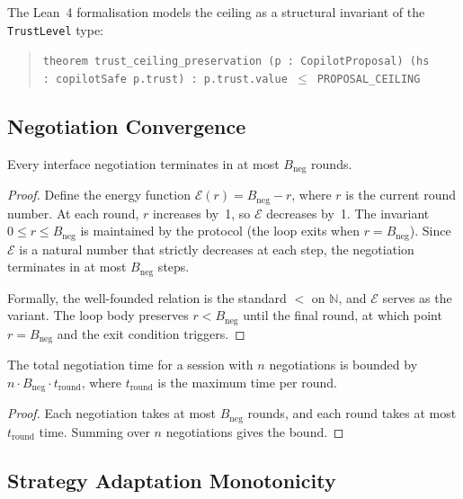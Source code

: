 \documentclass[11pt]{article}
\newcommand{\negbound}{B_{\mathrm{neg}}}
\newcommand{\energy}{\mathcal{E}}
\begin{document}
The Lean~4 formalisation models the ceiling as a structural
invariant of the \texttt{TrustLevel} type:
\begin{quote}
\texttt{theorem trust\_ceiling\_preservation (p :\ CopilotProposal)
        (hs :\ copilotSafe p.trust) :\
        p.trust.value $\leq$ PROPOSAL\_CEILING}
\end{quote}

\subsection{Negotiation Convergence}\label{sec:formal-neg}

\begin{theorem}\label{thm:neg-conv}
Every interface negotiation terminates in at most $\negbound$ rounds.
\end{theorem}

\begin{proof}
Define the energy function $\energy(r) = \negbound - r$, where $r$
is the current round number.  At each round, $r$ increases by~1,
so $\energy$ decreases by~1.  The invariant $0 \leq r \leq
\negbound$ is maintained by the protocol (the loop exits when
$r = \negbound$).  Since $\energy$ is a natural number that
strictly decreases at each step, the negotiation terminates in at
most $\negbound$ steps.

Formally, the well-founded relation is the standard $<$ on
$\mathbb{N}$, and $\energy$ serves as the variant.  The loop body
preserves $r < \negbound$ until the final round, at which point
$r = \negbound$ and the exit condition triggers.
\end{proof}

\begin{corollary}\label{cor:neg-termination}
The total negotiation time for a session with $n$ negotiations is
bounded by $n \cdot \negbound \cdot t_{\mathrm{round}}$, where
$t_{\mathrm{round}}$ is the maximum time per round.
\end{corollary}

\begin{proof}
Each negotiation takes at most $\negbound$ rounds, and each round
takes at most $t_{\mathrm{round}}$ time.  Summing over $n$
negotiations gives the bound.
\end{proof}

\subsection{Strategy Adaptation Monotonicity}\label{sec:formal-adapt}
\end{document}
